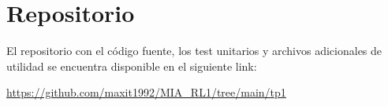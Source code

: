 
\chapter{Repositorio} %

\label{Repositorio}

El repositorio con el código fuente, los test unitarios y archivos adicionales de utilidad se encuentra disponible en el siguiente link:

\url{https://github.com/maxit1992/MIA_RL1/tree/main/tp1}

